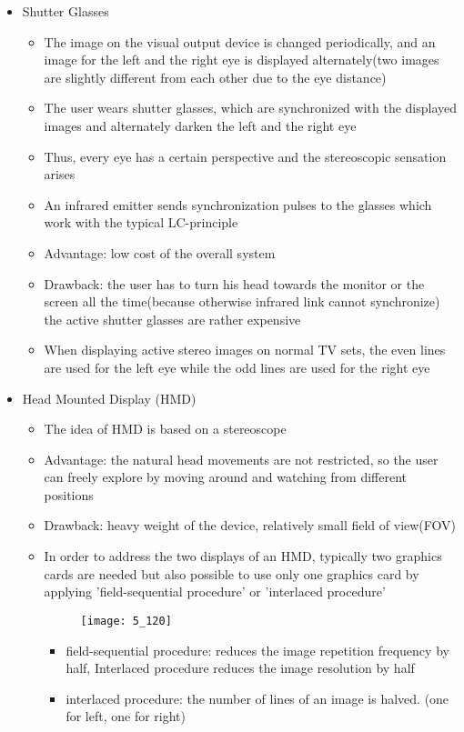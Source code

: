 \documentclass{standalone}
\begin{document}
\begin{itemize}
	\item Shutter Glasses
	\begin{itemize}
		\item The image on the visual output device is changed periodically, and an image for the left and the right eye is displayed alternately(two images are slightly different from each other due to the eye distance)
		\item The user wears shutter glasses, which are synchronized with the displayed images and alternately darken the left and the right eye
		\item Thus, every eye has a certain perspective and the stereoscopic sensation arises
		\item An infrared emitter sends synchronization pulses to the glasses which work with the typical LC-principle
		\item Advantage: low cost of the overall system
		\item Drawback: the user has to turn his head towards the monitor or the screen all the time(because otherwise infrared link cannot synchronize) \\
		the active shutter glasses are rather expensive
		\item When displaying active stereo images on normal TV sets, the even lines are used for the left eye while the odd lines are used for the right eye
	\end{itemize}
	
	\item Head Mounted Display (HMD)
	\begin{itemize}
		\item The idea of HMD is based on a stereoscope
		\item Advantage: the natural head movements are not restricted, so the user can freely explore by moving around and watching from different positions
		\item Drawback: heavy weight of the device, relatively small field of view(FOV)
		\item In order to address the two displays of an HMD, typically two graphics cards are needed but also possible to use only one graphics card by applying 'field-sequential procedure' or 'interlaced procedure' 

		\begin{figure}[H]
			\texttt{[image: 5\_120]}			
		\end{figure}
		
		\begin{itemize}
			\item field-sequential procedure: reduces the image repetition frequency by half, Interlaced procedure reduces the image resolution by half
			\item interlaced procedure: the number of lines of an image is halved. (one for left, one for right)
		\end{itemize}
		

\end{itemize}
\end{itemize}
\end{document}
